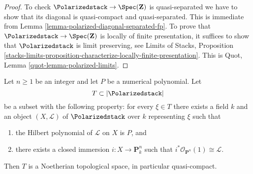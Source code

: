 \begin{proof}
To check $\Polarizedstack \to \Spec(\mathbf{Z})$ is quasi-separated we have to
show that its diagonal is quasi-compact and quasi-separated.
This is immediate from Lemma \ref{lemma-polarized-diagonal-separated-fp}.
To prove that $\Polarizedstack \to \Spec(\mathbf{Z})$ is locally of finite
presentation, it suffices to show that $\Polarizedstack$
is limit preserving, see Limits of Stacks, Proposition
\ref{stacks-limits-proposition-characterize-locally-finite-presentation}.
This is Quot, Lemma \ref{quot-lemma-polarized-limits}.
\end{proof}

\begin{lemma}
\label{lemma-bounded-polarized}
Let $n \geq 1$ be an integer and let $P$ be a numerical polynomial.
Let
$$
T \subset |\Polarizedstack|
$$
be a subset with the following property: for every $\xi \in T$
there exists a field $k$ and an object $(X, \mathcal{L})$
of $\Polarizedstack$ over $k$ representing $\xi$ such that
\begin{enumerate}
\item the Hilbert polynomial of $\mathcal{L}$ on $X$ is $P$, and
\item there exists a closed immersion $i : X \to \mathbf{P}^n_k$
such that $i^*\mathcal{O}_{\mathbf{P}^n}(1) \cong \mathcal{L}$.
\end{enumerate}
Then $T$ is a Noetherian topological space, in particular quasi-compact.
\end{lemma}

